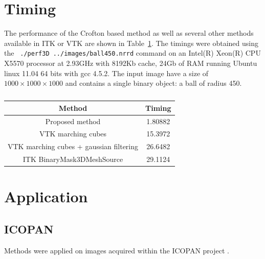 \documentclass{InsightArticle}
\begin{document}
\section{Timing}

The performance of the Crofton based method as well as several other methods available in ITK or VTK
are shown in Table~\ref{tab:perf}. The timings were obtained using the {\tt
./perf3D ../images/ball450.nrrd} command on an Intel(R) Xeon(R) CPU X5570 processor at 2.93GHz
with 8192Kb cache, 24Gb of RAM running Ubuntu linux 11.04 64 bits with gcc 4.5.2.
The input image have a size of $1000 \times 1000 \times 1000$ and contains a single binary object:
a ball of radius 450.


\begin{table}[!htb]
\begin{center}\begin{tabular}{cc}
Method                                   & Timing \\
 \hline 
 \hline
Proposed method                          & 1.80882 \\
VTK marching cubes                       & 15.3972 \\
VTK marching cubes + gaussian filtering  & 26.6482 \\
ITK BinaryMask3DMeshSource               & 29.1124 \\
 \hline
\end{tabular}\end{center}
\caption{ \label{tab:perf} }
\end{table}


\section{Application}

\subsection{ICOPAN}

Methods were applied on images acquired within the ICOPAN project \cite{Andrey2010}.

\appendix





\nocite{ITKSoftwareGuide}
\end{document}
